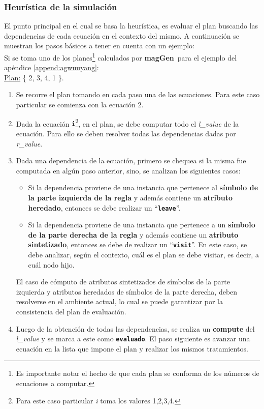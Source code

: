 \documentclass[runningheads,a4paper]{llncs}
\newcommand{\textbtt}[1]{\texttt{\textbf{#1}}}
\newcommand{\maggen}{\textbf{magGen}}
\begin{document}
\subsubsection{Heurística de la simulación}
\label{subsec:heuris-simul}
El punto principal en el cual se basa la heurística, es evaluar el plan buscando las dependencias de cada ecuación en el contexto del mismo. A continuación se muestran los pasos básicos a tener en cuenta con un ejemplo:\\

Si se toma uno de los planes\footnote{Es importante notar el hecho de que cada plan se conforma de los números de ecuaciones a computar.} calculados por \maggen\ para el ejemplo del apéndice \ref{append:agwuuyang}:\\

\underline{Plan:} \{ 2, 3, 4, 1 \}.

\begin{enumerate}
\item Se recorre el plan tomando en cada paso una de las ecuaciones. Para este caso particular se comienza con la ecuación 2.

\item Dada la ecuación \textbtt{i}\footnote{Para este caso particular \textit{i} toma los valores 1,2,3,4.}, en el plan, se debe computar todo el \textit{l\_value} de la ecuación. Para ello se deben resolver todas las dependencias dadas por \textit{r\_value}.

\item Dada una dependencia de la ecuación, primero se chequea si la misma fue computada en algún paso anterior, sino, se analizan los siguientes casos:

\begin{itemize}
\item Si la dependencia proviene de una instancia que pertenece al \textbf{símbolo de la parte izquierda de la regla} y además contiene un \textbf{atributo heredado}, entonces se debe realizar un ``\textbtt{leave}''.

\item Si la dependencia proviene de una instancia que pertenece a un \textbf{símbolo de la parte derecha de la regla} y además contiene un \textbf{atributo sintetizado}, entonces se debe de realizar un ``\textbtt{visit}''. En este caso, se debe analizar, según el contexto, cuál es el plan se debe visitar, es decir, a cuál nodo hijo. 
\end{itemize}

El caso de cómputo de atributos sintetizados de símbolos de la parte izquierda y atributos heredados de símbolos de la parte derecha, deben resolverse en el ambiente actual, lo cual se puede garantizar por la consistencia del plan de evaluación.

\item Luego de la obtención de todas las dependencias, se realiza un \textbf{compute} del \textit{l\_value} y se marca a este como \textbtt{evaluado}. El paso siguiente es avanzar una ecuación en la lista que impone el plan y realizar los mismos tratamientos.
\end{enumerate}
\end{document}
